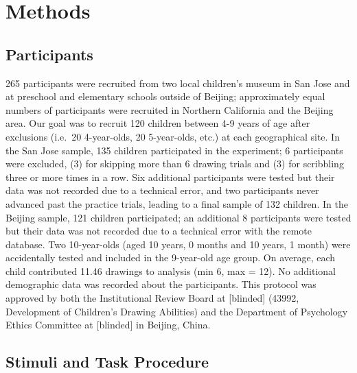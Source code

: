 \documentclass[
  man]{apa6}
\begin{document}
\hypertarget{methods}{%
\section{Methods}\label{methods}}

\hypertarget{participants}{%
\subsection{Participants}\label{participants}}

265 participants were recruited from two local children's museum in San Jose and at preschool and elementary schools outside of Beijing; approximately equal numbers of participants were recruited in Northern California and the Beijing area. Our goal was to recruit 120 children between 4-9 years of age after exclusions (i.e.~20 4-year-olds, 20 5-year-olds, etc.) at each geographical site. In the San Jose sample, 135 children participated in the experiment; 6 participants were excluded, (3) for skipping more than 6 drawing trials and (3) for scribbling three or more times in a row. Six additional participants were tested but their data was not recorded due to a technical error, and two participants never advanced past the practice trials, leading to a final sample of 132 children. In the Beijing sample, 121 children participated; an additional 8 participants were tested but their data was not recorded due to a technical error with the remote database. Two 10-year-olds (aged 10 years, 0 months and 10 years, 1 month) were accidentally tested and included in the 9-year-old age group. On average, each child contributed 11.46 drawings to analysis (min 6, max = 12). No additional demographic data was recorded about the participants. This protocol was approved by both the Institutional Review Board at {[}blinded{]} (43992, Development of Children's Drawing Abilities) and the Department of Psychology Ethics Committee at {[}blinded{]} in Beijing, China.

\hypertarget{stimuli-and-task-procedure}{%
\subsection{Stimuli and Task Procedure}\label{stimuli-and-task-procedure}}
\end{document}
